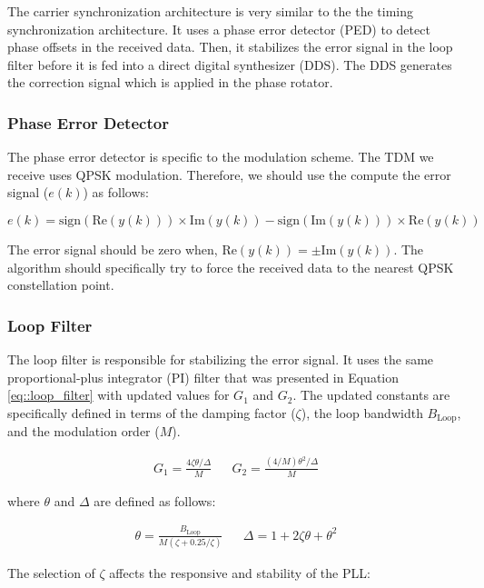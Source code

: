 \documentclass[conference,onecolumn]{IEEEtran}
\begin{document}
The carrier synchronization architecture is very similar to the the timing synchronization architecture. It uses a phase error detector (PED) to detect phase offsets in the received data. Then, it stabilizes the error signal in the loop filter before it is fed into a direct digital synthesizer (DDS). The DDS generates the correction signal which is applied in the phase rotator.

\subsubsection{Phase Error Detector}

The phase error detector is specific to the modulation scheme. The TDM we receive uses QPSK modulation. Therefore, we should use the compute the error signal ($e(k)$) as follows:

\begin{equation}
	e(k) = \text{sign}(\text{Re}(y(k))) \times \text{Im}(y(k)) - \text{sign}(\text{Im}(y(k))) \times \text{Re}(y(k))
\end{equation}

\noindent The error signal should be zero when, $\text{Re}(y(k)) = \pm\text{Im}(y(k))$. The algorithm should specifically try to force the received data to the nearest QPSK constellation point.

\subsubsection{Loop Filter}

The loop filter is responsible for stabilizing the error signal. It uses the same proportional-plus integrator (PI) filter that was presented in Equation \ref{eq::loop_filter} with updated values for $G_1$ and $G_2$. The updated constants are specifically defined in terms of the damping factor ($\zeta$), the loop bandwidth $B_{\text{Loop}}$, and the modulation order ($M$).

\begin{align}
	G_1 = \frac{4\zeta\theta/\Delta}{M} && G_2 = \frac{(4/M)\theta^2/\Delta}{M}
\end{align}

\noindent where $\theta$ and $\Delta$ are defined as follows:

\begin{align}
	\theta = \frac{B_{\text{Loop}}}{M(\zeta + 0.25/\zeta)} && \Delta = 1 + 2\zeta\theta + \theta^2
\end{align}

The selection of $\zeta$ affects the responsive and stability of the PLL:
\end{document}
